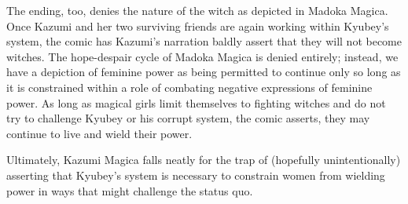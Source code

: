 The ending, too, denies the nature of the witch as depicted in Madoka Magica. Once Kazumi and her two surviving friends are again working within Kyubey's system, the comic has Kazumi's narration baldly assert that they will not become witches. The hope-despair cycle of Madoka Magica is denied entirely; instead, we have a depiction of feminine power as being permitted to continue only so long as it is constrained within a role of combating negative expressions of feminine power. As long as magical girls limit themselves to fighting witches and do not try to challenge Kyubey or his corrupt system, the comic asserts, they may continue to live and wield their power.

Ultimately, Kazumi Magica falls neatly for the trap of (hopefully unintentionally) asserting that Kyubey's system is necessary to constrain women from wielding power in ways that might challenge the status quo.
